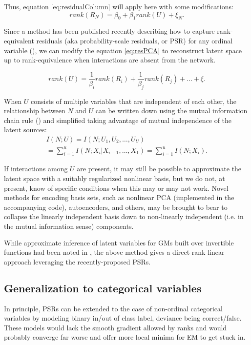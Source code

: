 \documentclass{article}
\begin{document}
Thus, equation \ref{eq:residualColumn} will apply here with some modifications:
\begin{equation}
rank(R_N) = \beta_0 + \beta_1 rank(U) + \xi_N.
\label{eq:residualColumnRank}
\end{equation}

Since a method has been published recently describing how to capture rank-equivalent residuals (aka probability-scale residuals, or PSR) for any ordinal variable (\cite{shepherd_probability-scale_2016}), we can modify the equation \ref{eq:resPCA} to reconstruct latent space up to rank-equivalence when interactions are absent from the network.

\begin{equation}
rank(U) = \frac{1}{\beta_i} rank(R_i) + \frac{1}{\beta_j} rank(R_j) + \dots + \xi. 
\label{resPcaGam}
\end{equation}

When $U$ consists of multiple variables that are independent of each other, the relationship between $N$ and $U$ can be written down using the mutual information chain rule (\cite{mackay_information_2003}) and simplified taking advantage of mutual independence of the latent sources:
\begin{equation}
\label{eq:rankSetRelationship}
\begin{split}
I(N; U) = I(N; U_1, U_2, \dots, U_U) \\= \sum_{i=1}^{u}{I(N; X_i | X_{i-1}, \dots, X_1)} = \sum_{i=1}^{u}{I(N; X_i)}.
\end{split}
\end{equation}

If interactions among $U$ are present, it may still be possible to approximate the latent space with a suitably regularized nonlinear basis, but we do not, at present, know of specific conditions when this may or may not work.  Novel methods for encoding basis sets, such as nonlinear PCA (implemented in the accompanying code), autoencoders, and others, may be brought to bear to collapse the linearly independent basis down to non-linearly independent (i.e. in the mutual information sense) components.

While approximate inference of latent variables for GMs built over invertible functions had been noted in \cite{elidan_ideal_2007}, the above method gives a direct rank-linear approach leveraging the recently-proposed PSRs.

\subsection{Generalization to categorical variables}
In principle, PSRs can be extended to the case of non-ordinal categorical variables by modeling binary in/out of class label, deviance being correct/false.  These models would lack the smooth gradient allowed by ranks and would probably converge far worse and offer more local minima for EM to get stuck in.  
\end{document}
